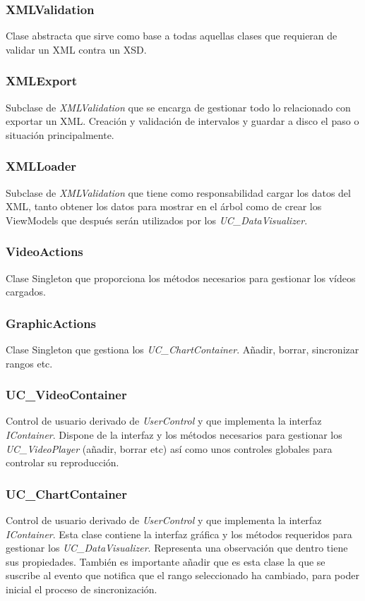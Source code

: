 \subsubsection{XMLValidation}
Clase abstracta que sirve como base a todas aquellas clases que requieran de validar un XML contra un XSD.

\subsubsection{XMLExport}
Subclase de \emph{XMLValidation} que se encarga de gestionar todo lo relacionado con exportar un XML. Creaci\'on y
validaci\'on de intervalos y guardar a disco el paso o situaci\'on principalmente.

\subsubsection{XMLLoader}
Subclase de \emph{XMLValidation} que tiene como responsabilidad cargar los datos del XML, tanto obtener los datos
para mostrar en el \'arbol como de crear los ViewModels que despu\'es ser\'an utilizados por los \emph{UC\_DataVisualizer}.

\subsubsection{VideoActions}
Clase Singleton que proporciona los m\'etodos necesarios para gestionar los v\'ideos cargados.

\subsubsection{GraphicActions}
Clase Singleton que gestiona los \emph{UC\_ChartContainer}. A\~nadir, borrar, sincronizar rangos etc.

\subsubsection{UC\_VideoContainer}
Control de usuario derivado de \emph{UserControl} y que implementa
la interfaz \emph{IContainer}. Dispone de la interfaz y los m\'etodos necesarios para
gestionar los \emph{UC\_VideoPlayer} (a\~nadir, borrar etc) as\'i como unos controles globales
para controlar su reproducci\'on.

\subsubsection{UC\_ChartContainer}
Control de usuario derivado de \emph{UserControl} y que implementa la interfaz
\emph{IContainer}. Esta clase contiene la interfaz gr\'afica y los m\'etodos requeridos para gestionar
los \emph{UC\_DataVisualizer}. Representa una observaci\'on que dentro tiene sus propiedades.
Tambi\'en es importante a\~nadir que es esta clase la que se suscribe al evento que notifica
que el rango seleccionado ha cambiado, para poder inicial el proceso de sincronizaci\'on.

